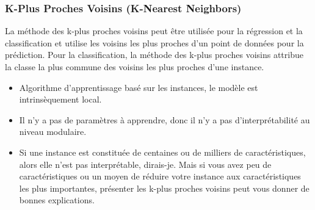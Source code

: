 \subsubsection{K-Plus Proches Voisins (K-Nearest Neighbors)}
La méthode des k-plus proches voisins peut être utilisée pour la régression et la classification et utilise les voisins les plus proches d'un point de données pour la prédiction. Pour la classification, la méthode des k-plus proches voisins attribue la classe la plus commune des voisins les plus proches d'une instance.
\begin{itemize}
    \item Algorithme d'apprentissage basé sur les instances, le modèle est intrinsèquement local.
    \item Il n'y a pas de paramètres à apprendre, donc il n'y a pas d'interprétabilité au niveau modulaire.
    \item Si une instance est constituée de centaines ou de milliers de caractéristiques, alors elle n'est pas interprétable, dirais-je. Mais si vous avez peu de caractéristiques ou un moyen de réduire votre instance aux caractéristiques les plus importantes, présenter les k-plus proches voisins peut vous donner de bonnes explications.
\end{itemize}
